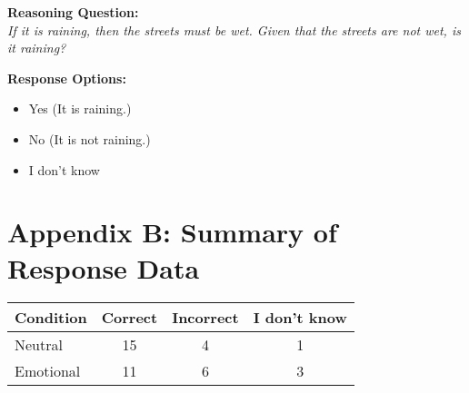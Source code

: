 \documentclass[12pt]{article}
\begin{document}
\textbf{Reasoning Question:} \\
\textit{If it is raining, then the streets must be wet. Given that the streets are not wet, is it raining?}

\textbf{Response Options:}
\begin{itemize}
    \item Yes (It is raining.)
    \item No (It is not raining.)
    \item I don’t know
\end{itemize}
\section*{Appendix B: Summary of Response Data}

\begin{center}
\begin{tabular}{lccc}
\textbf{Condition} & \textbf{Correct} & \textbf{Incorrect} & \textbf{I don't know} \\
\hline
Neutral & 15 & 4 & 1 \\
Emotional & 11 & 6 & 3 \\
\end{tabular}
\end{center}
\end{document}
